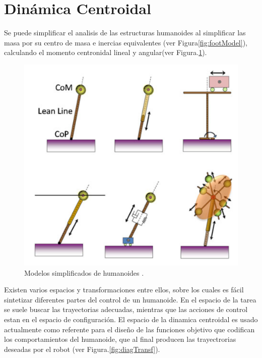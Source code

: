 \documentclass[journal,letterpaper,twoside,twocolumn]{IEEEtran}
\begin{document}
\section{Dinámica Centroidal}
\label{sec:dinCentr}
Se puede simplificar el analisis de las estructuras humanoides al simplificar las masa por su centro de masa e inercias equivalentes (ver Figura\ref{fig:footModel}), calculando el momento centronidal lineal y angular(ver Figura.\ref{fig:simpleModels}). 
\begin{figure}[!t]
  \centering
  \includegraphics[scale=0.4]{Orin2013CentroidalDynamics.png}
  \caption{Modelos simplificados de humanoides \protect\cite{Orin2013}.}
  \label{fig:simpleModels}
\end{figure}
Existen varios espacios y transformaciones entre ellos, sobre los cuales es fácil sintetizar diferentes partes del control de un humanoide. En el espacio de la tarea se suele buscar las trayectorias adecuadas, mientras que las acciones de control estan en el espacio de configuración. El espacio de la dinamica centroidal es usado actualmente como referente para el diseño de las funciones objetivo que codifican los comportamientos del humanoide, que al final producen las trayectrorias deseadas por el robot\cite{Felis2016a,Wensing2016} (ver Figura.\ref{fig:diagTransf}).
\end{document}
